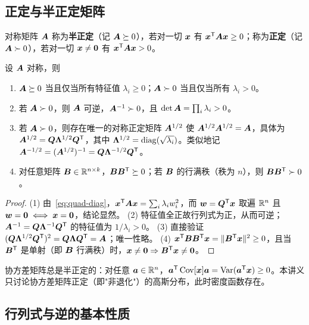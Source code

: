 \subsection{正定与半正定矩阵}

\begin{definition}[正定、半正定]
对称矩阵 $\bm{A}$ 称为\textbf{半正定}（记 $\bm{A}\succeq 0$），若对一切 $\bm{x}$ 有 $\bm{x}^{\mathsf{T}}\bm{A}\bm{x}\ge 0$；称为\textbf{正定}（记 $\bm{A}\succ 0$），若对一切 $\bm{x}\ne\bm{0}$ 有 $\bm{x}^{\mathsf{T}}\bm{A}\bm{x}>0$。
\end{definition}

\begin{proposition}\label{prop:pd}
设 $\bm{A}$ 对称，则
\begin{enumerate}[label=(\arabic*),nosep]
  \item $\bm{A}\succeq 0$ 当且仅当所有特征值 $\lambda_i\ge 0$；$\bm{A}\succ 0$ 当且仅当所有 $\lambda_i>0$。
  \item 若 $\bm{A}\succ 0$，则 $\bm{A}$ 可逆，$\bm{A}^{-1}\succ 0$，且 $\det\bm{A}=\prod_i\lambda_i>0$。
  \item 若 $\bm{A}\succ 0$，则存在唯一的对称正定矩阵 $\bm{A}^{1/2}$ 使 $\bm{A}^{1/2}\bm{A}^{1/2}=\bm{A}$，具体为 $\bm{A}^{1/2}=\bm{Q}\bm{\Lambda}^{1/2}\bm{Q}^{\mathsf{T}}$，其中 $\bm{\Lambda}^{1/2}=\operatorname{diag}(\sqrt{\lambda_i})$。类似地记 $\bm{A}^{-1/2}=(\bm{A}^{1/2})^{-1}=\bm{Q}\bm{\Lambda}^{-1/2}\bm{Q}^{\mathsf{T}}$。
  \item 对任意矩阵 $\bm{B}\in\mathbb{R}^{n\times k}$，$\bm{B}\bm{B}^{\mathsf{T}}\succeq 0$；若 $\bm{B}$ 的行满秩（秩为 $n$），则 $\bm{B}\bm{B}^{\mathsf{T}}\succ 0$。
\end{enumerate}
\end{proposition}

\begin{proof}
(1) 由~\eqref{eq:quad-diag}，$\bm{x}^{\mathsf{T}}\bm{A}\bm{x}=\sum_i\lambda_iw_i^2$，而 $\bm{w}=\bm{Q}^{\mathsf{T}}\bm{x}$ 取遍 $\mathbb{R}^n$ 且 $\bm{w}=\bm{0}\iff\bm{x}=\bm{0}$，结论显然。
(2) 特征值全正故行列式为正，从而可逆；$\bm{A}^{-1}=\bm{Q}\bm{\Lambda}^{-1}\bm{Q}^{\mathsf{T}}$ 的特征值为 $1/\lambda_i>0$。
(3) 直接验证 $(\bm{Q}\bm{\Lambda}^{1/2}\bm{Q}^{\mathsf{T}})^2=\bm{Q}\bm{\Lambda}\bm{Q}^{\mathsf{T}}=\bm{A}$；唯一性略。
(4) $\bm{x}^{\mathsf{T}}\bm{B}\bm{B}^{\mathsf{T}}\bm{x}=\|\bm{B}^{\mathsf{T}}\bm{x}\|^2\ge 0$，且当 $\bm{B}^{\mathsf{T}}$ 是单射（即 $\bm{B}$ 行满秩）时，$\bm{x}\ne\bm{0}\Rightarrow\bm{B}^{\mathsf{T}}\bm{x}\ne\bm{0}$。
\end{proof}

\begin{remark}
协方差矩阵总是半正定的：对任意 $\bm{a}\in\mathbb{R}^n$，$\bm{a}^{\mathsf{T}}\operatorname{Cov}[\bm{x}]\bm{a}=\operatorname{Var}(\bm{a}^{\mathsf{T}}\bm{x})\ge 0$。本讲义只讨论协方差矩阵正定（即"非退化"）的高斯分布，此时密度函数存在。
\end{remark}

\subsection{行列式与逆的基本性质}

